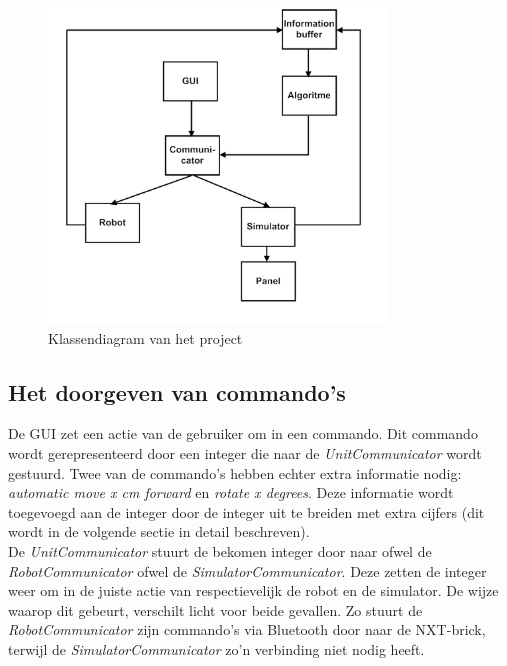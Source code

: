 \documentclass[tt3]{penoverslag}
\begin{document}
\begin{figure}[tbp]
\begin{center}
    \includegraphics[width=0.8\textwidth]{Klassendiagram}
    \caption{Klassendiagram van het project}
    \label{fig:klasDia}
\end{center}
\end{figure}


\subsection{Het doorgeven van commando's} %
\label{ssec:commands}
De GUI zet een actie van de gebruiker om in een commando. Dit commando wordt gerepresenteerd door een integer die naar de \textit{UnitCommunicator} wordt gestuurd. Twee van de commando's hebben echter extra informatie nodig: \textit{automatic move x cm forward} en \textit{rotate x degrees}. Deze informatie wordt toegevoegd aan de integer door de integer uit te breiden met extra cijfers (dit wordt in de volgende sectie in detail beschreven).\\
De \textit{UnitCommunicator} stuurt de bekomen integer door naar ofwel de \textit{RobotCommunicator} ofwel de \textit{SimulatorCommunicator}. Deze zetten de integer weer om in de juiste actie van respectievelijk de robot en de simulator. De wijze waarop dit gebeurt, verschilt licht voor beide gevallen. Zo stuurt de \textit{RobotCommunicator} zijn commando's via Bluetooth door naar de NXT-brick, terwijl de \textit{SimulatorCommunicator} zo'n verbinding niet nodig heeft.\\
\end{document}
